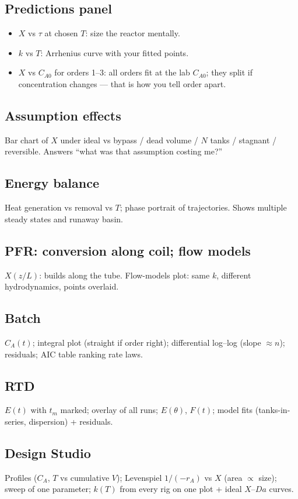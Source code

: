 \documentclass[11pt,a4paper]{article}
\begin{document}
\subsection{Predictions panel}
\begin{itemize}
  \item \(X\) vs \(\tau\) at chosen \(T\): size the reactor mentally.
  \item \(k\) vs \(T\): Arrhenius curve with your fitted points.
  \item \(X\) vs \(C_{A0}\) for orders 1--3: all orders fit at the lab \(C_{A0}\); they split if concentration changes --- that
  is how you tell order apart.
\end{itemize}

\subsection{Assumption effects}
Bar chart of \(X\) under ideal vs bypass / dead volume / \(N\) tanks / stagnant / reversible. Answers ``what was that
assumption costing me?''

\subsection{Energy balance}
Heat generation vs removal vs \(T\); phase portrait of trajectories. Shows multiple steady states and runaway basin.

\subsection{PFR: conversion along coil; flow models}
\(X(z/L)\): builds along the tube. Flow-models plot: same \(k\), different hydrodynamics, points overlaid.

\subsection{Batch}
\(C_A(t)\); integral plot (straight if order right); differential log--log (slope \(\approx n\)); residuals; AIC table ranking
rate laws.

\subsection{RTD}
\(E(t)\) with \(t_m\) marked; overlay of all runs; \(E(\theta)\), \(F(t)\); model fits (tanks-in-series, dispersion) + residuals.

\subsection{Design Studio}
Profiles (\(C_A\), \(T\) vs cumulative \(V\)); Levenspiel \(1/(-r_A)\) vs \(X\) (area \(\propto\) size); sweep of one parameter;
\(k(T)\) from every rig on one plot + ideal \(X\)--\(Da\) curves.
\end{document}
